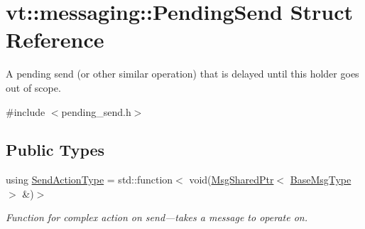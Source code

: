\hypertarget{structvt_1_1messaging_1_1_pending_send}{}\section{vt\+:\+:messaging\+:\+:Pending\+Send Struct Reference}
\label{structvt_1_1messaging_1_1_pending_send}


A pending send (or other similar operation) that is delayed until this holder goes out of scope.  




{\ttfamily \#include $<$pending\+\_\+send.\+h$>$}

\subsection*{Public Types}
\begin{DoxyCompactItemize}
\item 
using \hyperlink{structvt_1_1messaging_1_1_pending_send_aa13248a342d68230048cde8e0756851c}{Send\+Action\+Type} = std\+::function$<$ void(\hyperlink{structvt_1_1messaging_1_1_msg_shared_ptr}{Msg\+Shared\+Ptr}$<$ \hyperlink{namespacevt_a44d0d4e144748f2b19a1cfd962f50338}{Base\+Msg\+Type} $>$ \&)$>$
\begin{DoxyCompactList}\small\item\em Function for complex action on send---takes a message to operate on. \end{DoxyCompactList}\end{DoxyCompactItemize}
